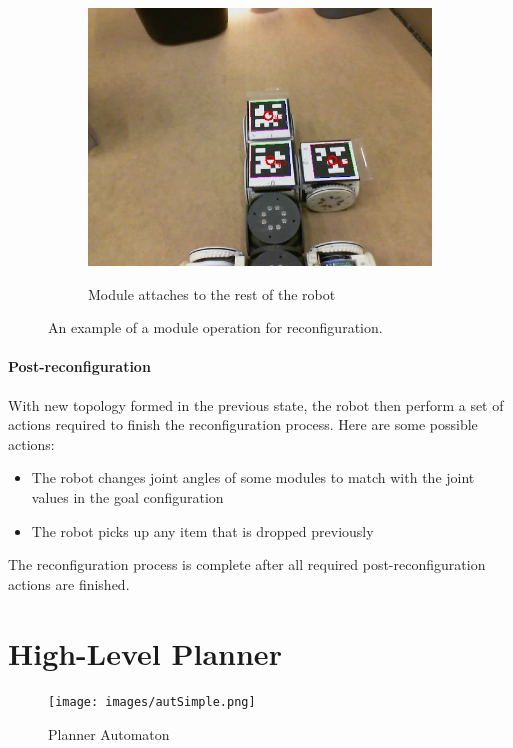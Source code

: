 \documentclass[conference]{IEEEtran}
\begin{document}
\begin{figure}[t]
\begin{subfigure}[t]{0.32\columnwidth}
        \includegraphics[width=\textwidth]{images/reconf_attach.jpg}
        \label{fig:reconfc}
        \caption{Module attaches to the rest of the robot}
    \end{subfigure}
    \caption{An example of a module operation for reconfiguration.}
      \label{fig:reconf}
\end{figure}

\paragraph{Post-reconfiguration} With new topology formed in the previous state, the robot then perform a set of actions required to finish the reconfiguration process. Here are some possible actions:
\begin{itemize}
\item The robot changes joint angles of some modules to match with the joint values in the goal configuration
\item The robot picks up any item that is dropped previously
\end{itemize}
The reconfiguration process is complete after all required post-reconfiguration actions are finished.

\section{High-Level Planner}
\label{sec:high-level}
%
\begin{figure}
\begin{center}
\texttt{[image: images/autSimple.png]}
\caption{Planner Automaton}
\label{fig:automaton}
\end{center}
\end{figure}
\end{document}
